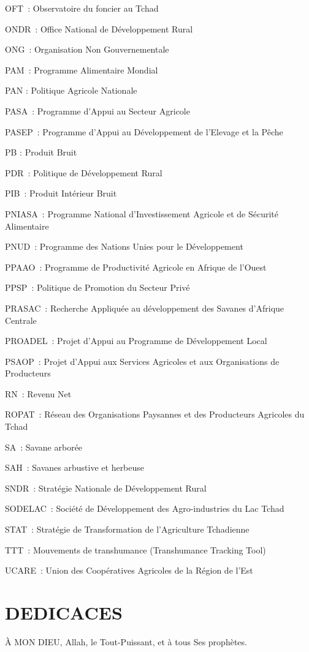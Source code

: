 \documentclass[12pt,oneside]{report}
\begin{document}
OFT : Observatoire du foncier au Tchad

ONDR : Office National de Développement Rural

ONG : Organisation Non Gouvernementale

PAM : Programme Alimentaire Mondial

PAN : Politique Agricole Nationale

PASA : Programme d'Appui au Secteur Agricole

PASEP : Programme d’Appui au Développement de l’Elevage et la Pêche

PB : Produit Bruit

PDR : Politique de Développement Rural

PIB : Produit Intérieur Bruit

PNIASA : Programme National d'Investissement Agricole et de Sécurité Alimentaire

PNUD : Programme des Nations Unies pour le Développement

PPAAO : Programme de Productivité Agricole en Afrique de l'Ouest

PPSP : Politique de Promotion du Secteur Privé

PRASAC : Recherche Appliquée au développement des Savanes d’Afrique Centrale

PROADEL : Projet d’Appui au Programme de Développement Local

PSAOP : Projet d’Appui aux Services Agricoles et aux Organisations de Producteurs

RN : Revenu Net

ROPAT : Réseau des Organisations Paysannes et des Producteurs Agricoles du Tchad

SA : Savane arborée

SAH : Savanes arbustive et herbeuse

SNDR : Stratégie Nationale de Développement Rural

SODELAC : Société de Développement des Agro-industries du Lac Tchad

STAT : Stratégie de Transformation de l'Agriculture Tchadienne

TTT : Mouvements de transhumance (Transhumance Tracking Tool)

UCARE : Union des Coopératives Agricoles de la Région de l’Est

\chapter{DEDICACES}
À MON DIEU, Allah, le Tout-Puissant, et à tous Ses prophètes.
\end{document}
